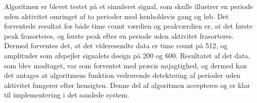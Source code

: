 Algoritmen er blevet testet på et simuleret signal, som skulle illustrer en periode uden aktivitet omringet af to perioder med henholdsvis gang og løb. Det forventede resultat for både time count værdien og peakværdien er, at det første peak frasorteres, og første peak efter en periode uden aktivitet frasorteres. Dermed forventes det, at det videresendte data er time count på 512, og amplituder som afspejler signalets design på 200 og 600. Resultatet af det data, som blev modtaget, var som forventet med præcis nøjagtighed, og dermed kan det antages at algoritmens funktion vedrørende detektering af perioder uden aktivitet fungerer efter hensigten. Denne del af algoritmen accepteres og er klar til implementering i det samlede system.